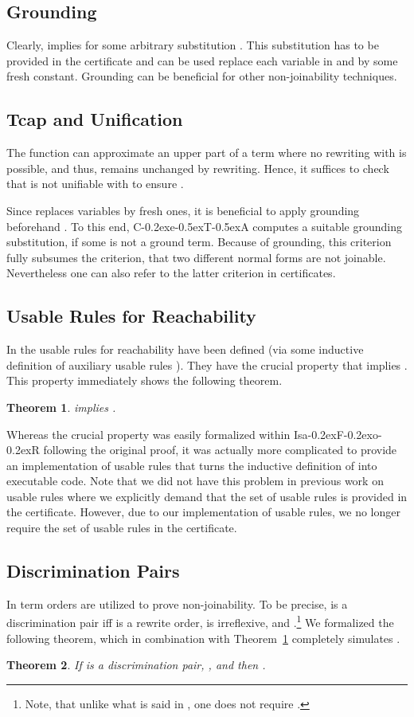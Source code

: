 \documentclass[a4paper]{easychair}
\newtheorem{theorem}{Theorem}
\newcommand\isafor{\textsf{Isa\kern-0.2exF\kern-0.2exo\kern-0.2exR}\xspace}
\newcommand\ceta{\textsf{C\kern-0.2exe\kern-0.5exT\kern-0.5exA}\xspace}
\newcommand\rTH[1]{Theorem~\ref{#1}}
\begin{document}
\subsection{Grounding}
Clearly,  implies  for
some arbitrary substitution . This substitution has to be provided in the certificate
and can be used replace each variable in  and  by some fresh constant.
Grounding can be beneficial for other non-joinability techniques.

\subsection{Tcap and Unification}
The function  can approximate an upper part of a term where no rewriting with 
is possible, and thus, remains unchanged by rewriting. Hence, \pagebreak
it suffices to check that  is not unifiable with 
to ensure .


Since  replaces variables by fresh ones, it is beneficial to
apply grounding beforehand \cite{ZFM11b}. To this end, \ceta computes a suitable 
grounding substitution, if some  is not a ground term. Because of  grounding, 
this criterion fully subsumes the criterion, that two different normal forms are not joinable.
Nevertheless one can also refer to the latter criterion in certificates.

\subsection{Usable Rules for Reachability}
In \cite{Aoto} the usable rules for reachability  have been defined (via some 
inductive definition of auxiliary usable rules ). They have
the crucial property that  implies .
This property immediately shows the following theorem.
\begin{theorem}
\label{usable}
 implies
.
\end{theorem}

Whereas the crucial property was easily formalized within \isafor following the 
original proof, it was actually more complicated to provide an implementation of usable rules
that turns the inductive definition of  into executable code. 
Note that we did not have this problem in previous work on
usable rules \cite{CSRT-RTA10} where we explicitly demand that the set of usable rules is provided in the certificate. However, due to our implementation of usable rules, we no longer require the
set of usable rules in the certificate.

\subsection{Discrimination Pairs}
In \cite{Aoto} term orders are utilized to prove non-joinability.
To be precise,  is a discrimination pair iff  is a rewrite order,
 is irreflexive, and .\footnote{Note, that
unlike what is said in \cite{Aoto}, one 
does not require .}
We formalized the following theorem, which in combination with \rTH{usable}
completely simulates \cite[Theorem 12]{Aoto}.
\begin{theorem}

\label{discrimination pairs}
If  is a discrimination pair, , 
and  then .
\end{theorem}
\end{document}
